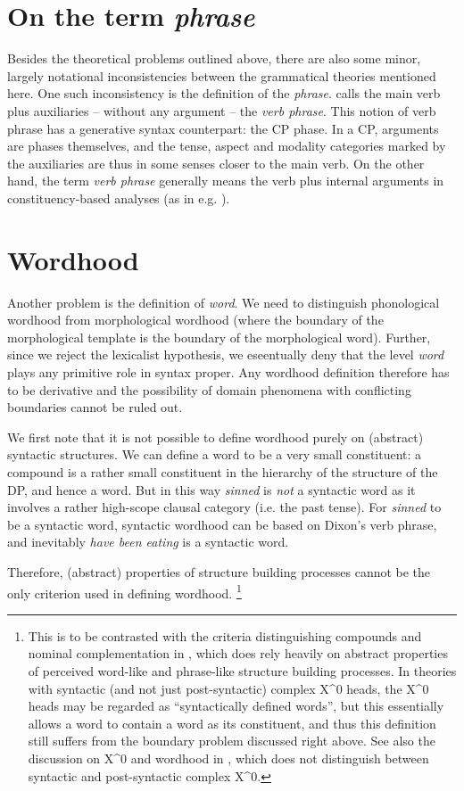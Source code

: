 \documentclass[UTF8, a4paper, oneside, scheme=plain, 12pt]{ctexrep}
\newcommand*{\term}[1]{\emph{#1}}
\newcommand{\form}[1]{\emph{#1}}
\begin{document}
{\section{On the term \term{phrase}}

Besides the theoretical problems outlined above, there are also some minor, largely notational inconsistencies between the grammatical theories mentioned here.
One such inconsistency is the definition of the \term{phrase}.
\citet{dixon2009basic} calls the main verb plus auxiliaries -- without any argument -- the \term{verb phrase}.
This notion of verb phrase has a generative syntax counterpart: the CP phase.
In a CP, arguments are phases themselves,
and the tense, aspect and modality categories marked by the auxiliaries are thus in some senses closer to the main verb.
On the other hand, the term \term{verb phrase} generally means the verb plus internal arguments in constituency-based analyses (as in e.g. \citealt{danckaert2017development}).

\section{Wordhood}\label{sec:theory.wordhood}

Another problem is the definition of \term{word}.
We need to distinguish phonological wordhood
from morphological wordhood (where the boundary of the morphological template is the boundary of the morphological word).
Further, since we reject the lexicalist hypothesis,
we eseentually deny that the level \term{word} plays any primitive role in syntax proper.
Any wordhood definition therefore has to be derivative and the possibility of domain phenomena with conflicting boundaries cannot be ruled out.

We first note that it is not possible to define wordhood purely on (abstract) syntactic structures.
We can define a word to be a very small constituent:
a compound is a rather small constituent in the hierarchy of the structure of the DP, and hence a word.
But in this way \form{sinned} is \emph{not} a syntactic word as it involves a rather high-scope clausal category (i.e. the past tense).
For \form{sinned} to be a syntactic word, syntactic wordhood can be based on Dixon's verb phrase,
and inevitably \form{have been eating} is a syntactic word.

Therefore, (abstract) properties of structure building processes cannot be the only criterion used in defining wordhood.%
\footnote{
    This is to be contrasted with the criteria distinguishing compounds and nominal complementation in \citet{cgel},
    which does rely heavily on abstract properties of perceived word-like and phrase-like structure building processes.
    In theories with syntactic (and not just post-syntactic) complex X^0 heads, the X^0 heads may be regarded as ``syntactically defined words'', but this essentially allows a word to contain a word as its constituent, and thus this definition still suffers from the boundary problem discussed right above. See also the discussion on X^0 and wordhood in \citet{bruening2018lexicalist}, which does not distinguish between syntactic and post-syntactic complex X^0. 
}

}
\end{document}
